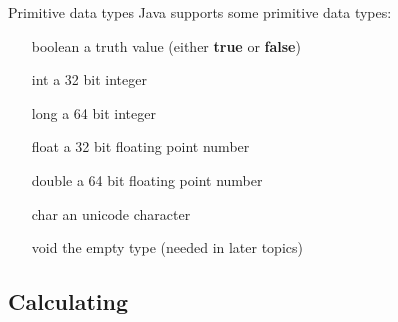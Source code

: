 \begin{frame}{Primitive data types}
	Java supports some primitive data types:
	\begin{itemize}
		\item[boolean] a truth value (either \textbf{true} or \textbf{false})
		\item[int] a 32 bit integer
		\item[long] a 64 bit integer
		\item[float] a 32 bit floating point number
		\item[double] a 64 bit floating point number
		\item[char] an unicode character
		\item[void] the empty type (needed in later topics)
	\end{itemize}
\end{frame}

\subsection{Calculating}

